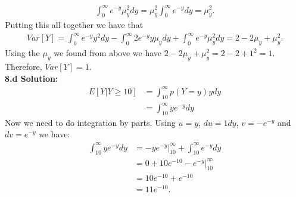 \documentclass[a4paper]{article}
\begin{document}
\begin{align*}
\int_{0}^{\infty}e^{-y}\mu_y^2dy = \mu_y^2\int_{0}^{\infty}e^{-y}dy = \mu_y^2.
\end{align*}
Putting this all together we have that
\begin{align*}
Var[Y]= \int_{0}^{\infty} e^{-y}y^2 dy -\int_{0}^{\infty}2e^{-y}y\mu_y dy+\int_{0}^{\infty}e^{-y}\mu_y^2dy
= 2 -2\mu_y+\mu_y^2.
\end{align*}
Using the $\mu_y$ we found from above we have $2 -2\mu_y+\mu_y^2= 2-2+1^2=1$.
Therefore, $Var[Y]=1$.
\medskip
\\
\textbf{8.d Solution:}
\begin{align*}
E[Y|Y\geq 10] &= \int_{10}^{\infty} p(Y=y)y dy \\
&= \int_{10}^{\infty} ye^{-y} dy
\end{align*}
Now we need to do integration by parts. Using $u=y$,
$du=1dy$, $v=-e^{-y}$ and $dv=e^{-y}$ we have:
\begin{align*}
\int_{10}^{\infty} ye^{-y} dy
 &= -ye^{-y}|_{10}^{\infty} + \int_{10}^{\infty} e^{-y} dy \\
 &= 0 +10e^{-10}-e^{-y}|_{10}^{\infty} \\
 &= 10e^{-10}+e^{-10} \\
 &= 11e^{-10}.
\end{align*}
\end{document}
